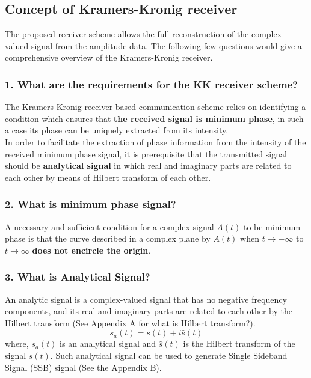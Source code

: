 \subsection{Concept of Kramers-Kronig receiver }
The proposed receiver scheme allows the full reconstruction of the complex-valued signal from the amplitude data. The following few questions would give a comprehensive overview of the Kramers-Kronig receiver.

\subsubsection{1. What are the requirements for the KK receiver scheme?}
The Kramers-Kronig receiver based communication scheme relies on identifying a condition which ensures that \textbf{the received signal is minimum phase}, in such a case its phase can be uniquely extracted from its intensity.\\ In order to facilitate the extraction of phase information from the intensity of the received minimum phase signal, it is prerequisite that the transmitted signal should be \textbf{analytical signal} in which real and imaginary parts are related to each other by means of Hilbert transform of each other.

\subsubsection{2. What is minimum phase signal?}
A necessary and sufficient condition for a complex signal $A(t)$ to be minimum phase is that the curve described in a complex plane by $A(t)$ when $t\rightarrow -\infty$ to $t\rightarrow \infty$ \textbf{does not encircle the origin}.

\subsubsection{3. What is Analytical Signal?}
An analytic signal is a complex-valued signal that has no negative frequency components, and its real and imaginary parts are related to each other by the Hilbert transform (See Appendix A for what is Hilbert transform?).
\begin{equation}
s_a(t)=s(t)+i\hat{s}(t)
\label{Analytical signal}
\end{equation}
where, $s_a(t)$ is an analytical signal and $\hat{s}(t)$ is the Hilbert transform of the signal ${s}(t)$. Such analytical signal can be used to generate Single Sideband Signal (SSB) signal (See the Appendix B).

